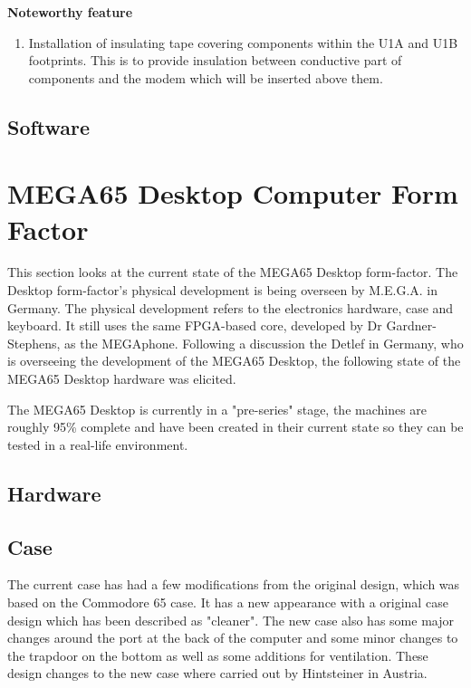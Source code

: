 \textbf{Noteworthy feature}
\begin{enumerate}
\item Installation of insulating tape covering components within the U1A and U1B footprints. This is to provide insulation between conductive part of components and the modem which will be inserted above them. \\
\end{enumerate}


\subsection{Software}



\section{MEGA65 Desktop Computer Form Factor}
This section looks at the current state of the MEGA65 Desktop form-factor. The Desktop form-factor's physical development is being overseen by M.E.G.A. in Germany. The physical development refers to the electronics hardware, case and keyboard. It still uses the same FPGA-based core, developed by Dr Gardner-Stephens, as the MEGAphone. Following a discussion the Detlef in Germany, who is overseeing the development of the MEGA65 Desktop, the following state of the MEGA65 Desktop hardware was elicited. 

The MEGA65 Desktop is currently in a "pre-series" stage, the machines are roughly 95\% complete and have been created in their current state so they can be tested in a real-life environment. 

\subsection{Hardware}


\subsection{Case}
The current case has had a few modifications from the original design, which was based on the Commodore 65 case. It has a new appearance with a original case design which has been described as "cleaner". The new case also has some major changes around the port at the back of the computer and some minor changes to the trapdoor on the bottom as well as some additions for ventilation. These design changes to the new case where carried out by Hintsteiner in Austria.

